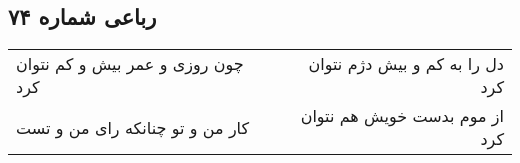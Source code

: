 \begin{center}
\section*{رباعی شماره ۷۴}
\label{sec:sh074}
\begin{longtable}{l p{0.5cm} r}
چون روزی و عمر بیش و کم نتوان کرد
&&
دل را به کم و بیش دژم نتوان کرد
\\
کار من و تو چنانکه رای من و تست
&&
از موم بدست خویش هم نتوان کرد
\\
\end{longtable}
\end{center}
